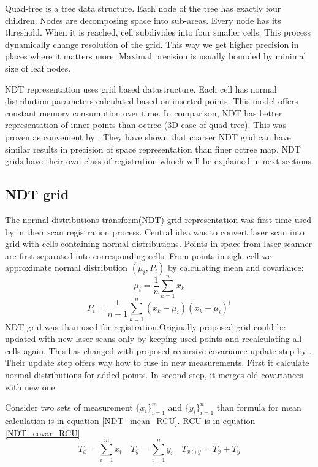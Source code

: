 Quad-tree is a tree data structure. Each node of the tree has exactly four children. Nodes are decomposing space into sub-areas. Every node has its threshold. When it is reached, cell subdivides into four smaller cells. This process dynamically change resolution of the grid. This way we get higher precision in places where it matters more. Maximal precision is usually bounded by minimal size of leaf nodes.

\gls{NDT} representation uses grid based datastructure. Each cell has normal distribution parameters calculated based on inserted points. This model offers constant memory consumption over time. In comparison, \gls{NDT} has better representation of inner points than octree (3D case of quad-tree). This was proven as convenient by \cite{Saarinen13}. They have shown that coarser \gls{NDT} grid can have similar results in precision of space representation than finer octree map. \gls{NDT} grids have their own class of registration whoch will be explained in next sections.     
\newpage


\subsection{NDT grid}
\label{subsec:NDT_grid}
The normal distributions transform(NDT) grid representation was first time used by \cite{Biber03} in their scan registration process. Central idea was to convert laser scan into grid with cells containing normal distributions. Points in space from laser scanner are first separated into corresponding cells. From points in sigle cell we approximate normal distribution $(\mu_{i},P_{i})$ by calculating mean and covariance:
\begin{equation}
\mu_{i} = \dfrac{1}{n}\sum_{k=1}^{n}x_{k}
\end{equation}  
\begin{equation}
P_{i} = \dfrac{1}{n-1}\sum_{k=1}^{n}(x_{k}-\mu_{i})(x_{k}-\mu_{i})^{t}
\end{equation} 
NDT grid was than used for registration.Originally proposed grid could be updated with new laser scans only by keeping used points and recalculating all cells again. This has changed with proposed recursive covariance update step by \cite{Saarinen13}. Their update step offers way how to fuse in new measurements. First it calculate normal distributions for added points. In second step, it merges old covariances with new one.

Consider two sets of measurement $\{x_{i}\}^{m}_{i=1}$ and $\{y_{i}\}^{n}_{i=1}$ than formula for mean calculation is in equation \eqref{NDT_mean_RCU}. \gls{RCU} is in equation \eqref{NDT_covar_RCU}
\begin{equation}
T_{x} = \sum_{i =1}^{m}x_{i} \quad
T_{y} = \sum_{i =1}^{n}y_{i} \quad
T_{x\oplus y} = T_{x} + T_{y} 
\end{equation}

